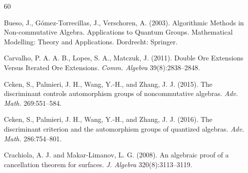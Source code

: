 \documentclass{amsart}
\theoremstyle{definition}
\theoremstyle{remark}
\numberwithin{equation}{section}
\begin{document}
\begin{thebibliography}{60}






 Bueso, J., G\'omez-Torrecillas, J., Verschoren, A. (2003). Algorithmic Methods in Non-commutative Algebra. Applications to Quantum Groups. Mathematical Modelling: Theory and Applications. Dordrecht: Springer.

 Carvalho, P. A. A. B., Lopes, S. A., Matczuk, J. (2011). Double Ore Extensions Versus Iterated Ore Extensions. {\em Comm. Algebra} 39(8):2838--2848.

 Ceken, S., Palmieri, J. H., Wang, Y.-H., and Zhang, J. J. (2015). The discriminant controls automorphism groups of noncommutative algebras. {\em Adv. Math.} 269:551--584.

 Ceken, S., Palmieri, J. H., Wang, Y.-H., and Zhang, J. J. (2016). The discriminant criterion and the automorphism groups of quantized algebras. {\em Adv. Math.} 286:754--801.


 Crachiola, A. J. and Makar-Limanov, L. G. (2008). An algebraic proof of a cancellation theorem for surfaces. {\em J. Algebra} 320(8):3113--3119.


\end{thebibliography}
\end{document}
